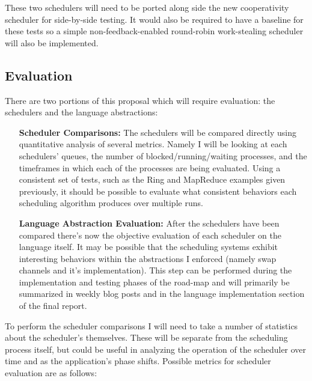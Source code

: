 These two schedulers will need to be ported along side the new cooperativity scheduler for side-by-side testing. It
would also be required to have a baseline for these tests so a simple non-feedback-enabled round-robin work-stealing scheduler
will also be implemented.

\subsection{Evaluation}
\label{sec:workevaluation}

There are two portions of this proposal which will require evaluation: the schedulers and the language abstractions:

\begin{itemize}
\item[{\bf Scheduler Comparisons:}] The schedulers will be compared directly using quantitative analysis of several
metrics. Namely I will be looking at each schedulers' queues, the number of blocked/running/waiting processes, and
the timeframes in which each of the processes are being evaluated. Using a consistent set of tests, such as the 
Ring and MapReduce examples given previously, it should be possible to evaluate what consistent behaviors each 
scheduling algorithm produces over multiple runs.

\item[{\bf Language Abstraction Evaluation:}] After the schedulers have been compared there's now the objective
	evaluation of each scheduler on the language itself. It may be possible that the scheduling systems
	exhibit interesting behaviors within the abstractions I enforced (namely swap channels and it's 
	implementation). This step can be performed during the implementation and testing phases of the 
	road-map and will primarily be summarized in weekly blog posts and in the language implementation
	section of the final report.

\end{itemize}

To perform the scheduler comparisons I will need to take a number of statistics about the scheduler's themselves.
These will be separate from the scheduling process itself, but could be useful in analyzing the operation of the
scheduler over time and as the application's phase shifts. Possible metrics for scheduler evaluation are as follows:

